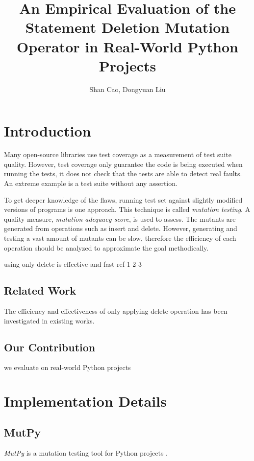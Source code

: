 \documentclass[12pt]{article}
\title{\textbf{An Empirical Evaluation of the Statement Deletion Mutation Operator in Real-World Python Projects}}
\author{Shan Cao, Dongyuan Liu}
\begin{document}
\maketitle
\tableofcontents

\section{Introduction}

Many open-source libraries use test coverage as a measurement of test suite quality. However, test coverage only guarantee the code is being executed when running the tests, it does not check that the tests are able to detect real faults. An extreme example is a test suite without any assertion.

To get deeper knowledge of the flaws, running test set against slightly modified versions of programs is one approach\cite{}. This technique is called \emph{mutation testing}. A quality measure, \emph{mutation adequacy score}, is used to assess. The mutants are generated from operations such as insert and delete. However, generating and testing a vast amount of mutants can be slow, therefore the efficiency of each operation should be analyzed to approximate the goal methodically.

using only delete is effective and fast ref 1 2 3

\subsection{Related Work}

The efficiency and effectiveness of only applying delete operation has been investigated in existing works.

\subsection{Our Contribution}

we evaluate on real-world Python projects

\section{Implementation Details}

\subsection{MutPy}

\emph{MutPy} is a mutation testing tool for Python projects \cite{mutpy}.
\end{document}

